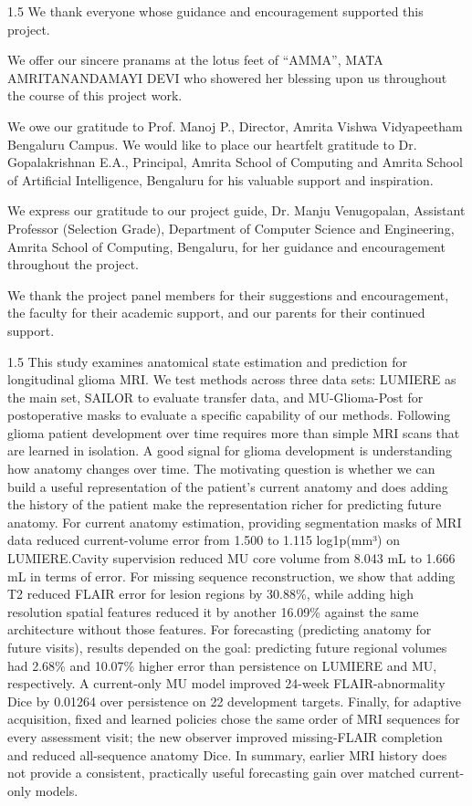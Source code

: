 \begin{spacing}{1.5}\setlength{\parindent}{0.5in}
We thank everyone whose guidance and encouragement supported this project.

We offer our sincere pranams at the lotus feet of “AMMA”, MATA AMRITANANDAMAYI  DEVI who showered her blessing upon us throughout the course of this project work.

We owe our gratitude to Prof. Manoj P., Director, Amrita Vishwa Vidyapeetham Bengaluru Campus. We would like to place our heartfelt gratitude to Dr. Gopalakrishnan E.A., Principal, Amrita School of Computing and Amrita School of Artificial Intelligence, Bengaluru for his valuable support and inspiration.

We express our gratitude to our project guide, Dr. Manju Venugopalan, Assistant Professor (Selection Grade), Department of Computer Science and Engineering, Amrita School of Computing, Bengaluru, for her guidance and encouragement throughout the project.

We thank the project panel members for their suggestions and encouragement, the faculty for their academic support, and our parents for their continued support.
\end{spacing}
\begin{spacing}{1.5}
  This study examines anatomical state estimation and prediction for longitudinal glioma MRI. We test methods across three data sets: LUMIERE  as the main set, SAILOR to evaluate transfer data, and MU-Glioma-Post for postoperative masks to evaluate a specific capability of our methods. Following glioma patient development over time requires more than simple MRI scans that are learned in isolation. A good signal for glioma development is understanding how anatomy changes over time. The motivating question is whether we can build a useful representation of the patient's current anatomy and does adding the history of the patient make the representation richer for predicting future anatomy. For current anatomy estimation, providing segmentation masks of MRI data reduced current-volume error from 1.500 to 1.115 log1p(mm³) on LUMIERE.Cavity supervision reduced MU core volume from 8.043 mL to 1.666 mL in terms of error. For missing sequence reconstruction, we show that adding T2 reduced FLAIR error for lesion regions by 30.88\%, while adding high resolution spatial features reduced it by another 16.09\% against the same architecture without those features. For forecasting (predicting anatomy for future visits), results depended on the goal: predicting future regional volumes had 2.68\% and 10.07\% higher error than persistence on LUMIERE and MU, respectively. A current-only MU model improved 24-week FLAIR-abnormality Dice by 0.01264 over persistence on 22 development targets. Finally, for adaptive acquisition, fixed and learned policies chose the same order of MRI sequences for every assessment visit; the new observer improved missing-FLAIR completion and reduced all-sequence anatomy Dice. In summary, earlier MRI history does not provide a consistent, practically useful forecasting gain over matched current-only models. 
\end{spacing}
